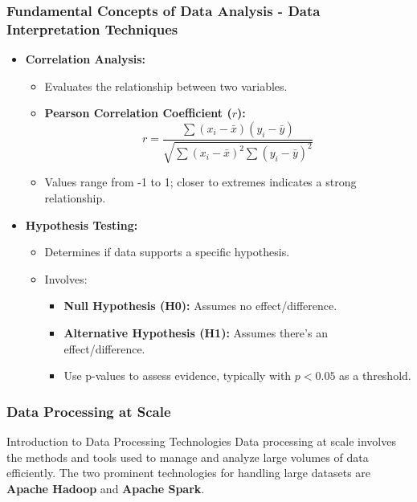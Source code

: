 \documentclass{beamer}
\begin{document}
\begin{frame}[fragile]
    \frametitle{Fundamental Concepts of Data Analysis - Data Interpretation Techniques}
    \begin{itemize}
        \item \textbf{Correlation Analysis:}
        \begin{itemize}
            \item Evaluates the relationship between two variables.
            \item \textbf{Pearson Correlation Coefficient (\(r\)):}
            \begin{equation}
            r = \frac{\sum (x_i - \bar{x})(y_i - \bar{y})}{\sqrt{\sum (x_i - \bar{x})^2 \sum (y_i - \bar{y})^2}}
            \end{equation}
            \item Values range from -1 to 1; closer to extremes indicates a strong relationship.
        \end{itemize}
        
        \item \textbf{Hypothesis Testing:}
        \begin{itemize}
            \item Determines if data supports a specific hypothesis.
            \item Involves:
            \begin{itemize}
                \item \textbf{Null Hypothesis (H0):} Assumes no effect/difference.
                \item \textbf{Alternative Hypothesis (H1):} Assumes there's an effect/difference.
                \item Use p-values to assess evidence, typically with \( p < 0.05 \) as a threshold.
            \end{itemize}
        \end{itemize}
    \end{itemize}
\end{frame}

\begin{frame}[fragile]
    \frametitle{Data Processing at Scale}
    \begin{block}{Introduction to Data Processing Technologies}
        Data processing at scale involves the methods and tools used to manage and analyze large volumes of data efficiently. The two prominent technologies for handling large datasets are \textbf{Apache Hadoop} and \textbf{Apache Spark}.
    \end{block}
\end{frame}
\end{document}
